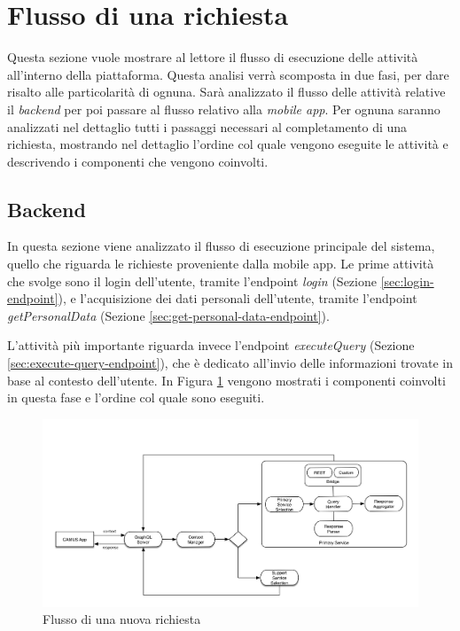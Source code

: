 \section{Flusso di una richiesta}

Questa sezione vuole mostrare al lettore il flusso di esecuzione delle attività all'interno della piattaforma. Questa analisi verrà scomposta in due fasi, per dare risalto alle particolarità di ognuna. Sarà analizzato il flusso delle attività relative il \emph{backend} per poi passare al flusso relativo alla \emph{mobile app}. Per ognuna saranno analizzati nel dettaglio tutti i passaggi necessari al completamento di una richiesta, mostrando nel dettaglio l'ordine col quale vengono eseguite le attività e descrivendo i componenti che vengono coinvolti.

\subsection{Backend\label{sec:flusso-richiesta-server}}

In questa sezione viene analizzato il flusso di esecuzione principale del sistema, quello che riguarda le richieste proveniente dalla mobile app. Le prime attività che svolge sono il login dell'utente, tramite l'endpoint \emph{login} (Sezione \ref{sec:login-endpoint}), e l'acquisizione dei dati personali dell'utente, tramite l'endpoint \emph{getPersonalData} (Sezione \ref{sec:get-personal-data-endpoint}).

L'attività più importante riguarda invece l'endpoint \emph{executeQuery} (Sezione \ref{sec:execute-query-endpoint}), che è dedicato all'invio delle informazioni trovate in base al contesto dell'utente. In Figura \ref{fig:flusso-nuova-richiesta} vengono mostrati i componenti coinvolti in questa fase e l'ordine col quale sono eseguiti.

\begin{figure}[ht]
	\centering
	\includegraphics[width=\textwidth]{4-progettazione-alto-livello/Immagini/flusso-richiesta-backend.png}
	\caption{Flusso di una nuova richiesta\label{fig:flusso-nuova-richiesta}}
\end{figure}

